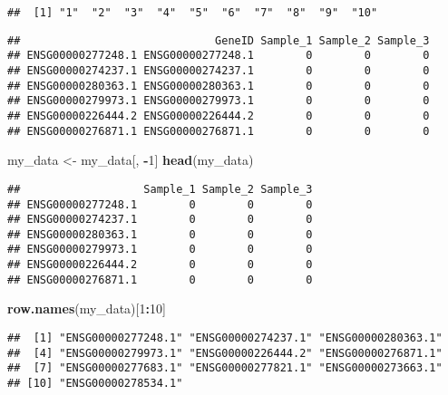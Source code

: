 \documentclass[]{article}
\newenvironment{Shaded}{\begin{snugshade}}{\end{snugshade}}
\newcommand{\KeywordTok}[1]{\textcolor[rgb]{0.13,0.29,0.53}{\textbf{#1}}}
\newcommand{\DecValTok}[1]{\textcolor[rgb]{0.00,0.00,0.81}{#1}}
\newcommand{\StringTok}[1]{\textcolor[rgb]{0.31,0.60,0.02}{#1}}
\newcommand{\OperatorTok}[1]{\textcolor[rgb]{0.81,0.36,0.00}{\textbf{#1}}}
\newcommand{\NormalTok}[1]{#1}
\begin{document}
\begin{verbatim}
##  [1] "1"  "2"  "3"  "4"  "5"  "6"  "7"  "8"  "9"  "10"
\end{verbatim}

\begin{Shaded}
\end{Shaded}

\begin{verbatim}
##                              GeneID Sample_1 Sample_2 Sample_3
## ENSG00000277248.1 ENSG00000277248.1        0        0        0
## ENSG00000274237.1 ENSG00000274237.1        0        0        0
## ENSG00000280363.1 ENSG00000280363.1        0        0        0
## ENSG00000279973.1 ENSG00000279973.1        0        0        0
## ENSG00000226444.2 ENSG00000226444.2        0        0        0
## ENSG00000276871.1 ENSG00000276871.1        0        0        0
\end{verbatim}

\begin{Shaded}
\begin{Highlighting}[]
\NormalTok{my_data <-}\StringTok{ }\NormalTok{my_data[, }\OperatorTok{-}\DecValTok{1}\NormalTok{]}
\KeywordTok{head}\NormalTok{(my_data)}
\end{Highlighting}
\end{Shaded}

\begin{verbatim}
##                   Sample_1 Sample_2 Sample_3
## ENSG00000277248.1        0        0        0
## ENSG00000274237.1        0        0        0
## ENSG00000280363.1        0        0        0
## ENSG00000279973.1        0        0        0
## ENSG00000226444.2        0        0        0
## ENSG00000276871.1        0        0        0
\end{verbatim}

\begin{Shaded}
\begin{Highlighting}[]
\KeywordTok{row.names}\NormalTok{(my_data)[}\DecValTok{1}\OperatorTok{:}\DecValTok{10}\NormalTok{]}
\end{Highlighting}
\end{Shaded}

\begin{verbatim}
##  [1] "ENSG00000277248.1" "ENSG00000274237.1" "ENSG00000280363.1"
##  [4] "ENSG00000279973.1" "ENSG00000226444.2" "ENSG00000276871.1"
##  [7] "ENSG00000277683.1" "ENSG00000277821.1" "ENSG00000273663.1"
## [10] "ENSG00000278534.1"
\end{verbatim}
\end{document}
